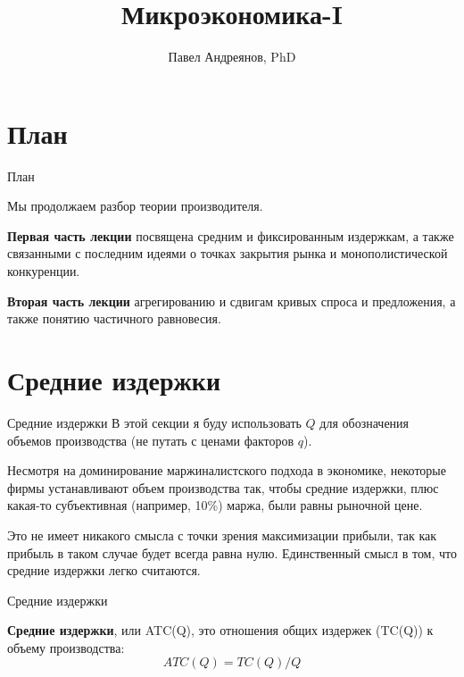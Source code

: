 \documentclass{beamer}
\title{
Микроэкономика-I
}
\author{
Павел Андреянов, PhD
}
\begin{document}
\maketitle

\section{План}

\begin{frame}{План}
	
Мы продолжаем разбор теории производителя.

\textbf{Первая часть лекции} посвящена средним и фиксированным издержкам, а также связанными с последним идеями о точках закрытия рынка и монополистической конкуренции.

\textbf{Вторая часть лекции} агрегированию и сдвигам кривых спроса и предложения, а также понятию частичного равновесия.
	
\end{frame}

\section{Средние издержки}

\begin{frame}{Средние издержки}
В этой секции я буду использовать $Q$ для обозначения объемов производства (не путать с ценами факторов $q$).

Несмотря на доминирование маржиналистского подхода в экономике, некоторые фирмы устанавливают объем производства так, чтобы средние издержки, плюс какая-то субъективная (например, 10\%) маржа, были равны рыночной цене. 

Это не имеет никакого смысла с точки зрения максимизации прибыли, так как прибыль в таком случае будет всегда равна нулю. Единственный смысл в том, что средние издержки легко считаются.

\end{frame}

\begin{frame}{Средние издержки}

\begin{definition}
\textbf{Средние издержки}, или ATC(Q), это отношения общих издержек (TC(Q)) к объему производства:
$$ATC(Q) = TC(Q)/Q$$

\end{definition}

\end{frame}
\end{document}
